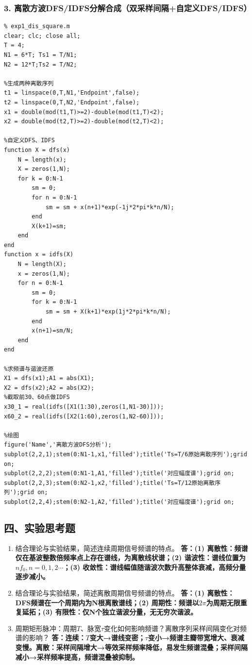 \subsubsection{3. 离散方波DFS/IDFS分解合成（双采样间隔+自定义DFS/IDFS）}
\begin{lstlisting}
% exp1_dis_square.m
clear; clc; close all;
T = 4;
N1 = 6*T; Ts1 = T/N1;
N2 = 12*T;Ts2 = T/N2;

%生成两种离散序列
t1 = linspace(0,T,N1,'Endpoint',false);
t2 = linspace(0,T,N2,'Endpoint',false);
x1 = double(mod(t1,T)>=2)-double(mod(t1,T)<2);
x2 = double(mod(t2,T)>=2)-double(mod(t2,T)<2);

%自定义DFS、IDFS
function X = dfs(x)
    N = length(x);
    X = zeros(1,N);
    for k = 0:N-1
        sm = 0;
        for n = 0:N-1
            sm = sm + x(n+1)*exp(-1j*2*pi*k*n/N);
        end
        X(k+1)=sm;
    end
end
function x = idfs(X)
    N = length(X);
    x = zeros(1,N);
    for n = 0:N-1
        sm = 0;
        for k = 0:N-1
            sm = sm + X(k+1)*exp(1j*2*pi*k*n/N);
        end
        x(n+1)=sm/N;
    end
end

%求频谱与谐波还原
X1 = dfs(x1);A1 = abs(X1);
X2 = dfs(x2);A2 = abs(X2);
%截取前30、60点做IDFS
x30_1 = real(idfs([X1(1:30),zeros(1,N1-30)]));
x60_2 = real(idfs([X2(1:60),zeros(1,N2-60)]));

%绘图
figure('Name','离散方波DFS分析');
subplot(2,2,1);stem(0:N1-1,x1,'filled');title('Ts=T/6原始离散序列');grid on;
subplot(2,2,2);stem(0:N1-1,A1,'filled');title('对应幅度谱');grid on;
subplot(2,2,3);stem(0:N2-1,x2,'filled');title('Ts=T/12原始离散序列');grid on;
subplot(2,2,4);stem(0:N2-1,A2,'filled');title('对应幅度谱');grid on;
\end{lstlisting}

\subsection{四、实验思考题}
\begin{enumerate}
    \item 结合理论与实验结果，简述连续周期信号频谱的特点。
    \textbf{答：(1) 离散性：频谱仅在基波整数倍频率点上存在谱线，为离散线状谱；(2) 谐波性：谱线位置为$nf_0,n=0,1,2\cdots$；(3) 收敛性：谱线幅值随谐波次数升高整体衰减，高频分量逐步减小。}
    
    \item 结合理论与实验结果，简述离散周期信号频谱的特点。
    \textbf{答：(1) 离散性：DFS频谱在一个周期内为N根离散谱线；(2) 周期性：频谱以$2\pi$为周期无限重复延拓；(3) 有限性：仅N个独立谐波分量，无无穷次谐波。}
    
    \item 周期矩形脉冲：周期$T$、脉宽$\tau$变化如何影响频谱？离散序列采样间隔变化对频谱的影响？
    \textbf{答：连续：$T$变大→谱线变密；$\tau$变小→频谱主瓣带宽增大、衰减变慢。离散：采样间隔增大→等效采样频率降低，易发生频谱混叠；采样间隔减小→采样频率提高，频谱混叠被抑制。}
\end{enumerate}